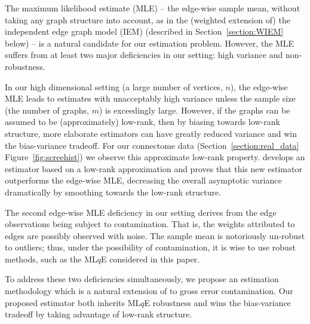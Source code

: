 \documentclass[a4paper]{article}
\begin{document}
The maximum likelihood estimate (MLE) -- the edge-wise sample mean, without taking any graph structure into account, as in the (weighted extension of) the independent edge graph model (IEM) \citep{bollobas2007phase} (described in Section~\ref{section:WIEM} below) --
is a natural candidate for our estimation problem. However, the MLE suffers from at least two major deficiencies in our setting: high variance and non-robustness.

In our high dimensional setting (a large number of vertices, $n$), the edge-wise MLE leads to  estimates with unacceptably high variance unless the sample size (the number of graphs, $m$) is exceedingly large.
However, if the graphs can be assumed to be (approximately) low-rank, then by biasing towards low-rank structure, more elaborate estimators can have greatly reduced variance and win the bias-variance tradeoff.
For our connectome data (Section~\ref{section:real_data} Figure~\ref{fig:screehist})
we observe this approximate low-rank property. \citet{tang2016law} develops an estimator based on a low-rank approximation and proves that this new estimator outperforms the edge-wise MLE, decreasing the overall asymptotic variance dramatically by smoothing towards the low-rank structure.

The second edge-wise MLE deficiency in our setting derives from the edge observations being subject to contamination. That is, the weights attributed to edges are possibly observed with noise.
The sample mean is notoriously un-robust to outliers;
thus, under the possibility of contamination, it is wise to use robust methods, such as the ML$q$E \citep{ferrari2010maximum, qin2013maximum} considered in this paper.

To address these two deficiencies simultaneously, we propose an estimation methodology which is a natural extension of \citep{tang2016law} to gross error contamination. Our proposed estimator both inherits ML$q$E robustness and wins the bias-variance tradeoff by taking advantage of low-rank structure.
\end{document}
